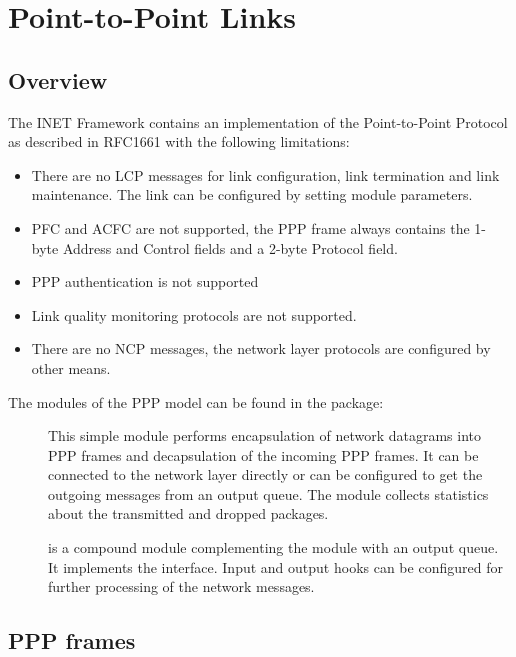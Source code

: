 \chapter{Point-to-Point Links}
\label{cha:ppp}


\section{Overview}

The INET Framework contains an implementation of the Point-to-Point Protocol
as described in RFC1661 with the following limitations:

\begin{itemize}
\item There are no LCP messages for link configuration,
link termination and link maintenance.
The link can be configured by setting module parameters.
\item PFC and ACFC are not supported, the PPP frame
always contains the 1-byte Address and Control fields
and a 2-byte Protocol field.
\item PPP authentication is not supported
\item Link quality monitoring protocols are not supported.
\item There are no NCP messages, the network layer protocols are
configured by other means.
\end{itemize}

The modules of the PPP model can be found in the 
package:

\begin{description}
\item[] This simple module performs encapsulation
of network datagrams into PPP frames and decapsulation of
the incoming PPP frames. It can be connected to the network
layer directly or can be configured to get the outgoing messages
from an output queue. The module collects statistics about
the transmitted and dropped packages.

\item[] is a compound module complementing
the  module with an output queue. It implements
the  interface. Input and output hooks can be configured
for further processing of the network messages.
  
\end{description}

\section{PPP frames}

